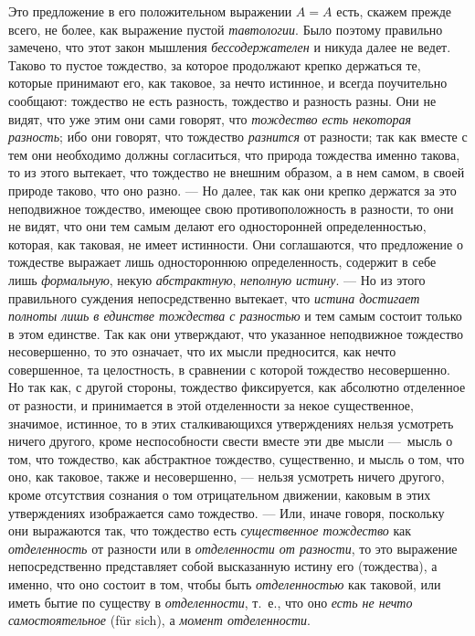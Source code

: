 Это предложение в его положительном выражении $A=A$ есть,
скажем прежде всего, не более, как выражение пустой
{\em тавтологии}. Было поэтому правильно замечено, что
этот закон мышления {\em бессодержателен} и никуда
далее не ведет. Таково то пустое тождество, за которое продолжают крепко
держаться те, которые принимают его, как таковое, за нечто истинное, и
всегда поучительно сообщают: тождество не есть разность, тождество и
разность разны. Они не видят, что уже этим они сами говорят, что
{\em тождество есть некоторая разность}; ибо они
говорят, что тождество {\em разнится} от разности; так
как вместе с тем они необходимо должны согласиться, что природа тождества
именно такова, то из этого вытекает, что тождество не внешним образом, а в
нем самом, в своей природе таково, что оно разно. — Но далее, так как они
крепко держатся за это неподвижное тождество, имеющее свою
противоположность в разности, то они не видят, что они тем самым делают его
односторонней определенностью, которая, как таковая, не имеет истинности.
Они соглашаются, что предложение о тождестве выражает лишь одностороннюю
определенность, содержит в себе лишь {\em формальную},
некую {\em абстрактную},
{\em неполную истину}. — Но из этого правильного
суждения непосредственно вытекает, что {\em истина
достигает полноты лишь в единстве тождества с разностью} и тем самым
состоит только в этом единстве. Так как они утверждают, что указанное
неподвижное тождество несовершенно, то это означает, что их мысли
предносится, как нечто совершенное, та целостность, в сравнении с которой
тождество несовершенно. Но так как, с другой стороны, тождество
фиксируется, как абсолютно отделенное от разности, и принимается в этой
отделенности за некое существенное, значимое, истинное, то в этих
сталкивающихся утверждениях нельзя усмотреть ничего другого, кроме
неспособности свести вместе эти две мысли —~мысль о том, что тождество, как
абстрактное тождество, существенно, и мысль о том, что оно, как таковое,
также и несовершенно, — нельзя усмотреть ничего другого, кроме отсутствия
сознания о том отрицательном движении, каковым в этих утверждениях
изображается само тождество. — Или, иначе говоря, поскольку они выражаются
так, что тождество есть {\em существенное тождество}
как {\em отделенность} от разности или в
{\em отделенности от разности}, то это выражение
непосредственно представляет собой высказанную истину его (тождества), а
именно, что оно состоит в том, чтобы быть
{\em отделенностью} как таковой, или иметь бытие по
существу в {\em отделенности}, т.~е., что оно
{\em есть не нечто самостоятельное} (für sich), а
{\em момент отделенности}.

